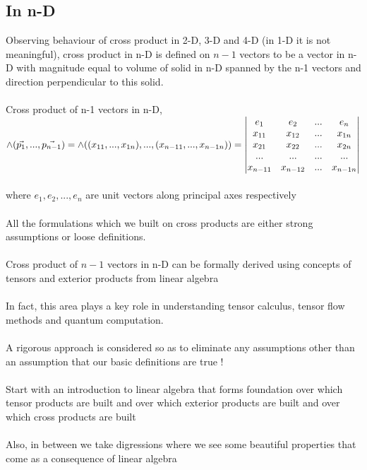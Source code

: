 \documentclass{article}
\begin{document}
    \subsection{In n-D}
    Observing behaviour of cross product in 2-D, 3-D and 4-D (in 1-D it is not meaningful), cross product in n-D is defined on $n-1$ vectors to be a vector in n-D with magnitude equal to volume of solid in n-D spanned by the n-1 vectors and direction perpendicular to this solid. \\ \\
    Cross product of n-1 vectors in n-D, \\
    $\land(\Vec{p_1},...,\Vec{p_{n-1}}) = \land((x_{11},...,x_{1n}),...,(x_{n-11},...,x_{n-1n})) = \mdet{e_{1} & e_{2}  & ... & e_{n}  \\ x_{11} & x_{12} & ... & x_{1n} \\ x_{21} & x_{22} & ... & x_{2n} \\ ... & ... & ... & ... \\ x_{n-11} & x_{n-12} & ... & x_{n-1n}} $ \\ \\
    where $e_1, e_2 , ... , e_n$ are unit vectors along principal axes respectively \\ \\
    All the formulations which we built on cross products are either strong assumptions or loose definitions. \\ \\
    Cross product of $n-1$ vectors in n-D can be formally derived using concepts of tensors and exterior products from linear algebra \\ \\
    In fact, this area plays a key role in understanding tensor calculus, tensor flow methods and quantum computation. \\ \\
    A rigorous approach is considered so as to eliminate any assumptions other than an assumption that our basic definitions are true ! \\ \\
    Start with an introduction to linear algebra that forms foundation over which tensor products are built and over which exterior products are built and over which cross products are built\\ \\
    Also, in between we take digressions where we see some beautiful properties that come as a consequence of linear algebra \\ \\
\end{document}
